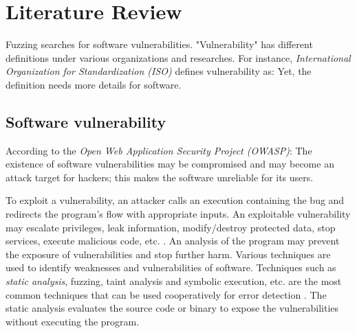 \section{Literature Review} \label{sec:2.2}

Fuzzing searches for software vulnerabilities. "Vulnerability" has different definitions under various organizations and researches. For instance, \textit{International Organization for Standardization (ISO)} defines vulnerability as:  \cite{iso27008} Yet, the definition needs more details for software. 

\subsection{Software vulnerability}
\label{sec:2.2.1}

According to the \textit{Open Web Application Security Project (OWASP)}:  The existence of software vulnerabilities may be compromised and may become an attack target for hackers; this makes the software unreliable for its users.

To exploit a vulnerability, an attacker calls an execution containing the bug and redirects the program's flow with appropriate inputs. An exploitable vulnerability may escalate privileges, leak information, modify/destroy protected data, stop services, execute malicious code, etc. \cite{chang2011trend}. An analysis of the program may prevent the exposure of vulnerabilities and stop further harm. Various techniques are used to identify weaknesses and vulnerabilities of software. Techniques such as \textit{static analysis}, fuzzing, taint analysis and symbolic execution, etc. are the most common techniques that can be used cooperatively for error detection \cite{su2016vuldetection}. The static analysis evaluates the source code or binary to expose the vulnerabilities without executing the program.



